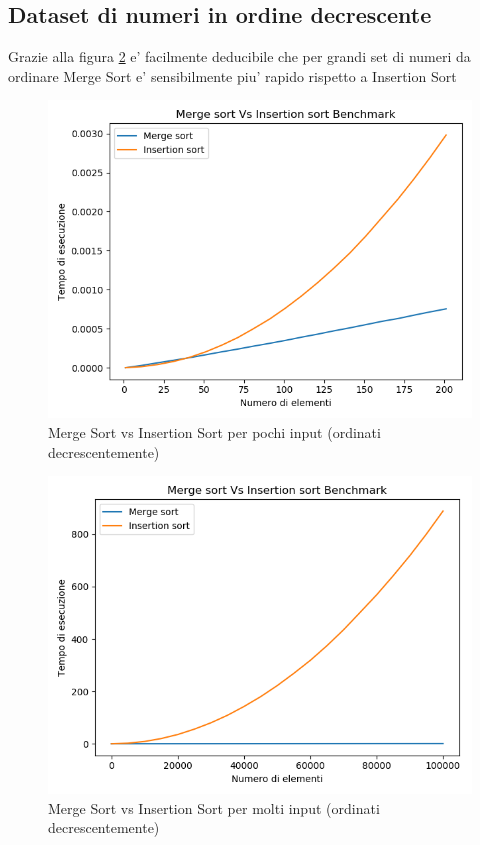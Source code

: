 \documentclass[a4paper]{article}
\begin{document}
\newpage		
\subsection{Dataset di numeri in ordine decrescente}
Grazie alla figura \ref{fig:BigInsMergeDecr} e' facilmente deducibile che per grandi set di numeri da ordinare Merge Sort  e' sensibilmente piu' rapido rispetto a Insertion Sort 
 
		\begin{figure}[!htb]
		\centering
		\includegraphics[scale=0.3]{4}
		\caption{Merge Sort vs Insertion Sort per pochi input (ordinati decrescentemente)}
		\label{fig:SmallInsMergeDecr}
		\end{figure}
		
		\begin{figure}[!htb]
		\centering
		\includegraphics[scale=0.3]{3}
		\caption{Merge Sort vs Insertion Sort per molti input (ordinati decrescentemente)}
		\label{fig:BigInsMergeDecr}
		\end{figure}
\newpage		
\end{document}
